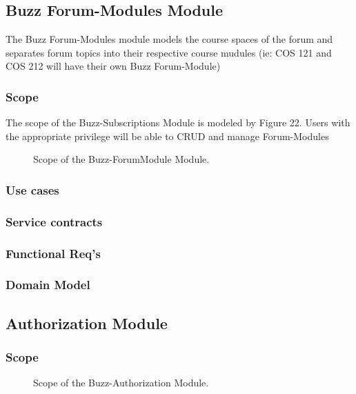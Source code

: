 \documentclass[12pt]{article}
\begin{document}
\subsection{Buzz Forum-Modules Module}
\par{The Buzz Forum-Modules module models the course spaces of the forum and separates forum topics into their respective course mudules (ie: COS 121 and COS 212 will have their own Buzz Forum-Module)}
\subsubsection{Scope}
\par{The scope of the Buzz-Subscriptions Module is modeled by Figure 22. Users with the appropriate privilege will be able to CRUD and manage Forum-Modules}

\begin{figure}[h]
\iffalse\texttt{[image: Diagrams/scopeForumModules.jpeg]}\fi
\caption{Scope of the Buzz-ForumModule Module.}
\label{Use-case: Buzz-ForumModules}
\end{figure}

\subsubsection{Use cases}
\subsubsection{Service contracts}
\subsubsection{Functional Req's}
\subsubsection{Domain Model}

\subsection{Authorization Module}
\par{}
\subsubsection{Scope}
\par{}

\begin{figure}[h]
\iffalse\texttt{[image: Diagrams/scopeAuth.jpeg]}\fi
\caption{Scope of the Buzz-Authorization Module.}
\label{Use-case: Buzz-Auth}
\end{figure}
\end{document}
